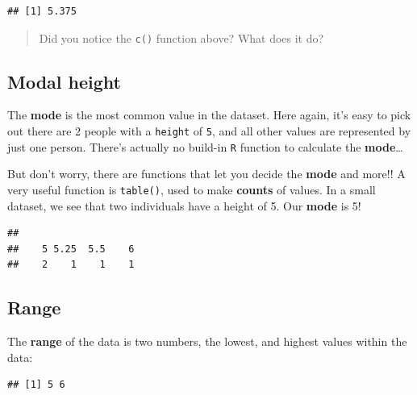\documentclass[
]{book}
\newenvironment{Shaded}{\begin{snugshade}}{\end{snugshade}}
\newcommand{\FunctionTok}[1]{\textcolor[rgb]{0.13,0.29,0.53}{\textbf{#1}}}
\newcommand{\NormalTok}[1]{#1}
\newcommand{\SpecialCharTok}[1]{\textcolor[rgb]{0.81,0.36,0.00}{\textbf{#1}}}
\begin{document}
\begin{verbatim}
## [1] 5.375
\end{verbatim}

\begin{quote}
Did you notice the \texttt{c()} function above? What does it do?
\end{quote}

\hypertarget{modal-height}{%
\subsection{Modal height}\label{modal-height}}

The \textbf{mode} is the most common value in the dataset. Here again, it's easy to pick out there are 2 people with a \texttt{height} of \texttt{5}, and all other values are represented by just one person. There's actually no build-in \texttt{R} function to calculate the \textbf{mode}\ldots{}

But don't worry, there are functions that let you decide the \textbf{mode} and more!! A very useful function is \texttt{table()}, used to make \textbf{counts} of values. In a small dataset, we see that two individuals have a height of 5. Our \textbf{mode} is 5!

\begin{Shaded}
\end{Shaded}

\begin{verbatim}
## 
##    5 5.25  5.5    6 
##    2    1    1    1
\end{verbatim}

\hypertarget{range}{%
\subsection{Range}\label{range}}

The \textbf{range} of the data is two numbers, the lowest, and highest values within the data:

\begin{Shaded}
\end{Shaded}

\begin{verbatim}
## [1] 5 6
\end{verbatim}
\end{document}

